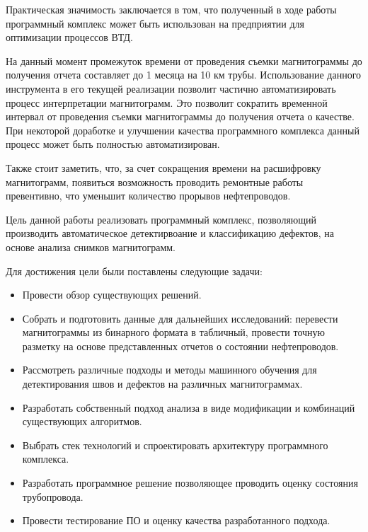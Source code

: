 \documentclass[a4paper,article,14pt]{extarticle}
\begin{document}
Практическая значимость заключается в том, что полученный в ходе работы программный комплекс может быть 
использован на предприятии для оптимизации процессов ВТД. 

На данный момент промежуток времени от проведения съемки магнитограммы до получения отчета составляет 
до 1 месяца на 10 км трубы. Использование данного инструмента в его текущей реализации позволит частично 
автоматизировать процесс интерпретации магнитограмм. Это позволит сократить временной интервал от проведения 
съемки магнитограммы до получения отчета о качестве. При некоторой доработке и улучшении качества программного 
комплекса данный процесс может быть полностью автоматизирован.

Также стоит заметить, что, за счет сокращения времени на расшифровку магнитограмм, появиться возможность 
проводить ремонтные работы превентивно, что уменьшит количество прорывов нефтепроводов.


\pagebreak
{}

Цель данной работы реализовать программный комплекс, позволяющий производить автоматическое детектирвоание и классификацию дефектов, на основе анализа снимков магнитограмм. 

\pagebreak
{}

Для достижения цели были поставлены следующие задачи:

\begin{itemize}
    \item Провести обзор существующих решений.
    \item Собрать и подготовить данные для дальнейших исследований: перевести магнитограммы из бинарного формата в табличный, 
    провести точную разметку на основе представленных отчетов о состоянии нефтепроводов.
    \item Рассмотреть различные подходы и методы машинного обучения для детектирования швов и дефектов на различных магнитограммах.
    \item Разработать собственный подход анализа в виде модификации и комбинаций существующих алгоритмов.
    \item Выбрать стек технологий и спроектировать архитектуру программного комплекса.
    \item Разработать программное решение позволяющее проводить оценку состояния трубопровода.
    \item Провести тестирование ПО и оценку качества разработанного подхода.
\end{itemize}
\end{document}
